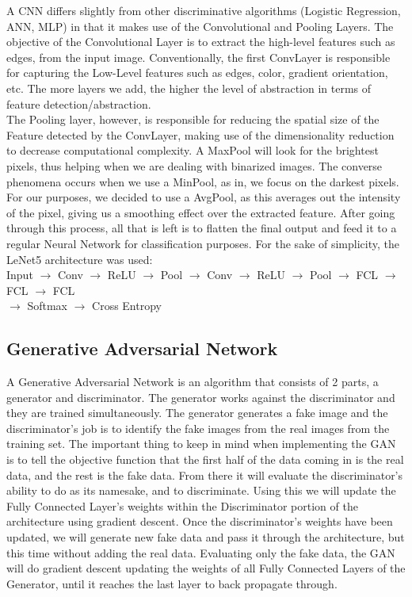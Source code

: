 \noindent A CNN differs slightly from other discriminative algorithms (Logistic Regression, ANN, MLP) in that it makes use of the Convolutional and Pooling Layers. The objective of the Convolutional Layer is to extract the high-level features such as edges, from the input image. Conventionally, the first ConvLayer is responsible for capturing the Low-Level features such as edges, color, gradient orientation, etc. The more layers we add, the higher the level of abstraction in terms of feature detection/abstraction. \cite{hussain_2020}\\

\noindent The Pooling layer, however, is responsible for reducing the spatial size of the Feature detected by the ConvLayer, making use of the dimensionality reduction to decrease computational complexity. A MaxPool will look for the brightest pixels, thus helping when we are dealing with binarized images. The converse phenomena occurs when we use a MinPool, as in, we focus on the darkest pixels. For our purposes, we decided to use a AvgPool, as this averages out the intensity of the pixel, giving us a smoothing effect over the extracted feature. After going through this process, all that is left is to flatten the final output and feed it to a regular Neural Network for classification purposes. For the sake of simplicity, the LeNet5 architecture was used:\\

\noindent Input $\rightarrow$ Conv $\rightarrow$ ReLU $\rightarrow$ Pool $\rightarrow$ Conv $\rightarrow$ ReLU $\rightarrow$ Pool $\rightarrow$ FCL $\rightarrow$ FCL $\rightarrow$ FCL\\
$\rightarrow$ Softmax $\rightarrow$ Cross Entropy \cite{analytics_vidhya_2021}

\subsection{Generative Adversarial Network}
\label{sec:methods:Generative Adversarial Network}
\noindent A Generative Adversarial Network is an algorithm that consists of 2 parts, a generator and discriminator. The generator works against the discriminator and they are trained simultaneously. The generator generates a fake image and the discriminator's job is to identify the fake images from the real images from the training set. The important thing to keep in mind when implementing the GAN is to tell the objective function that the first half of the data coming in is the real data, and the rest is the fake data. From there it will evaluate the discriminator's ability to do as its namesake, and to discriminate. Using this we will update the Fully Connected Layer's weights within the Discriminator portion of the architecture using gradient descent. Once the discriminator's weights have been updated, we will generate new fake data and pass it through the architecture, but this time without adding the real data. Evaluating only the fake data, the GAN will do gradient descent updating the weights of all Fully Connected Layers of the Generator, until it reaches the last layer to back propagate through. \\

